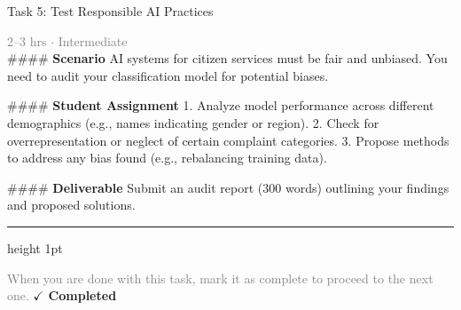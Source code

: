 \documentclass[10pt,a4paper]{article}
\begin{document}
\begin{taskbox}{Task 5: Test Responsible AI Practices}

    {\small \textcolor{gray}{2--3 hrs $\cdot$ Intermediate}}\\[12pt]

    \#\#\#\# \textbf{Scenario}  
AI systems for citizen services must be fair and unbiased. You need to audit your classification model for potential biases.  

\#\#\#\# \textbf{Student Assignment}  
1. Analyze model performance across different demographics (e.g., names indicating gender or region).  
2. Check for overrepresentation or neglect of certain complaint categories.  
3. Propose methods to address any bias found (e.g., rebalancing training data).  

\#\#\#\# \textbf{Deliverable}  
Submit an audit report (300 words) outlining your findings and proposed solutions.\par

    \vspace{16pt}

    \textcolor{cardBorder}{\hrule height 1pt}\vspace{8pt}

    \small \textcolor{gray}{When you are done with this task, mark it as complete to proceed to the next one.} \hfill \textbf{\textcolor{brandDark}{$\checkmark$ Completed}}

\end{taskbox}
\end{document}
